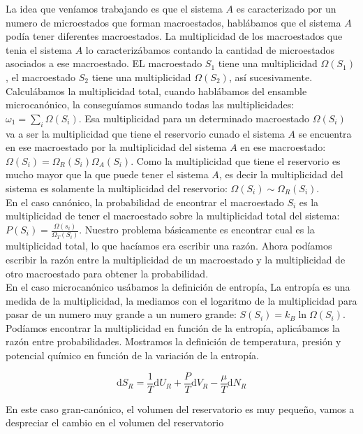 \documentclass[11pt,fleqn]{book}
\begin{document}
La idea que veníamos trabajando es que el sistema $A$ es caracterizado por un numero de microestados que forman macroestados, hablábamos que el sistema $A$ podía tener diferentes macroestados. La multiplicidad de los macroestados que tenia el sistema $A$ lo caracterizábamos contando la cantidad de microestados asociados a ese macroestado. EL macroestado $S_{1}$ tiene una multiplicidad $\Omega(S_{1})$, el macroestado $S_{2}$ tiene una multiplicidad $\Omega(S_{2})$, así sucesivamente. Calculábamos la multiplicidad total, cuando hablábamos del ensamble microcanónico, la conseguíamos sumando todas las multiplicidades: $\omega_{1}=\sum_{i}\Omega(S_{i})$. Esa multiplicidad para un determinado macroestado $\Omega(S_{i})$ va a ser la multiplicidad que tiene el reservorio cunado el sistema $A$ se encuentra en ese macroestado  por la multiplicidad del sistema $A$ en ese macroestado: $\Omega(S_{i})=\Omega_{R}(S_{i})\Omega_{A}(S_{i})$. Como la multiplicidad que tiene el reservorio es mucho mayor que la que puede tener el sistema $A$, es decir la multiplicidad del sistema es solamente la multiplicidad del reservorio: $\Omega(S_{i})\sim\Omega_{R}(S_{i})$.\\


En el caso canónico, la probabilidad de encontrar el macroestado $S_{i}$ es la multiplicidad de tener el macroestado sobre la multiplicidad total del sistema:$P(S_{i})=\frac{\Omega(s_{i})}{\Omega_{T}(S_{i})} $. Nuestro problema básicamente es encontrar cual es la multiplicidad total, lo que hacíamos era escribir una razón. Ahora podíamos escribir la razón entre la multiplicidad de un macroestado y la multiplicidad de otro macroestado para obtener la probabilidad.\\

En el caso microcanónico usábamos la definición de entropía, La entropía es una medida de la multiplicidad, la mediamos con el logaritmo de la multiplicidad para pasar de un numero muy grande a un numero grande: $S(S_{i})=k_{B}\ln{\Omega(S_{i})}$. Podíamos encontrar la multiplicidad  en función de la entropía, aplicábamos la  razón entre probabilidades. Mostramos la definición de temperatura, presión y potencial químico en función de la variación de la entropía. 

\begin{equation}
    \mathrm{d}S_{R}=\frac{1}{T}\mathrm{d}U_{R}+\frac{P}{T}\mathrm{d}V_{R}-\frac{\mu}{T}\mathrm{d}N_{R}
    \label{Eq. 5.1}
\end{equation}

En este caso gran-canónico, el volumen del reservatorio es muy pequeño, vamos a despreciar el cambio en el volumen del reservatorio
\end{document}
